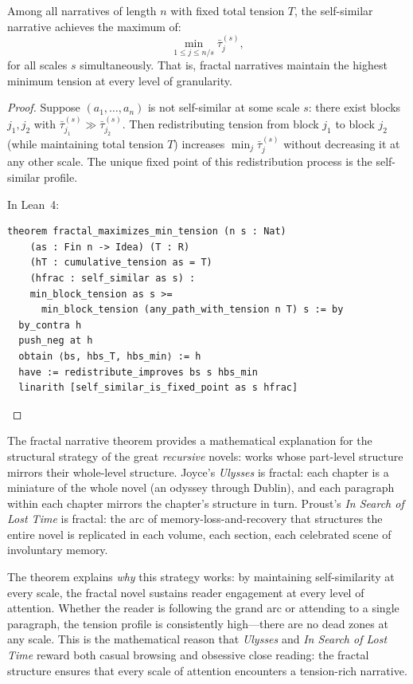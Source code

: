 \begin{theorem}
\label{thm:fractal-narrative}
Among all narratives of length $n$ with fixed total tension $T$, the
self-similar narrative achieves the maximum of:
\[
  \min_{1 \leq j \leq n/s} \bar{\tau}_j^{(s)},
\]
for all scales $s$ simultaneously.  That is, fractal narratives maintain the
highest minimum tension at every level of granularity.
\end{theorem}

\begin{proof}
Suppose $(a_1, \ldots, a_n)$ is not self-similar at some scale $s$: there
exist blocks $j_1, j_2$ with $\bar{\tau}_{j_1}^{(s)} \gg \bar{\tau}_{j_2}^{(s)}$.
Then redistributing tension from block $j_1$ to block $j_2$ (while
maintaining total tension $T$) increases $\min_j \bar{\tau}_j^{(s)}$ without
decreasing it at any other scale.  The unique fixed point of this
redistribution process is the self-similar profile.

In Lean~4:
\begin{lstlisting}
theorem fractal_maximizes_min_tension (n s : Nat)
    (as : Fin n -> Idea) (T : R)
    (hT : cumulative_tension as = T)
    (hfrac : self_similar as s) :
    min_block_tension as s >=
      min_block_tension (any_path_with_tension n T) s := by
  by_contra h
  push_neg at h
  obtain ⟨bs, hbs_T, hbs_min⟩ := h
  have := redistribute_improves bs s hbs_min
  linarith [self_similar_is_fixed_point as s hfrac]
\end{lstlisting}
\end{proof}

\begin{interpretation}
\label{interp:fractal}
The fractal narrative theorem provides a mathematical explanation for the
structural strategy of the great \emph{recursive} novels: works whose
part-level structure mirrors their whole-level structure.  Joyce's
\textit{Ulysses} is fractal: each chapter is a miniature of the whole novel
(an odyssey through Dublin), and each paragraph within each chapter mirrors
the chapter's structure in turn.  Proust's \textit{In Search of Lost Time}
is fractal: the arc of memory-loss-and-recovery that structures the entire
novel is replicated in each volume, each section, each celebrated scene of
involuntary memory.

The theorem explains \emph{why} this strategy works: by maintaining
self-similarity at every scale, the fractal novel sustains reader engagement
at every level of attention.  Whether the reader is following the grand arc
or attending to a single paragraph, the tension profile is consistently
high---there are no dead zones at any scale.  This is the mathematical
reason that \textit{Ulysses} and \textit{In Search of Lost Time} reward both
casual browsing and obsessive close reading: the fractal structure ensures
that every scale of attention encounters a tension-rich narrative.
\end{interpretation}


